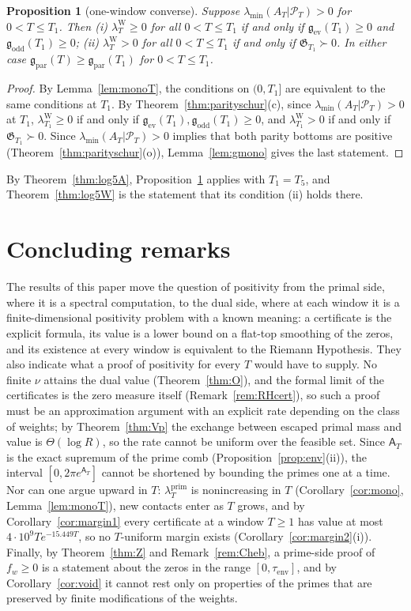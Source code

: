 \documentclass[11pt]{amsart}
\newtheorem{proposition}[theorem]{Proposition}
\theoremstyle{definition}
\theoremstyle{remark}
\newcommand{\PT}{\mathcal P_T}
\newcommand{\lamP}{\lambda^{\mathrm{prim}}_T}
\newcommand{\lamW}{\lambda^{\mathrm W}_T}
\newcommand{\lamA}{\lambda_{\min}(A_T|\PT)}
\newcommand{\Aconst}{\mathsf A_T}
\begin{document}
\begin{proposition}[one-window converse]\label{prop:onewindow}
Suppose $\lamA>0$ for $0<T\le T_1$. Then
\emph{(i)} $\lamW\ge0$ for all $0<T\le T_1$ if and only if $\mathfrak g_{\mathrm{ev}}(T_1)\ge0$ and
$\mathfrak g_{\mathrm{odd}}(T_1)\ge0$;
\emph{(ii)} $\lamW>0$ for all $0<T\le T_1$ if and only if $\mathfrak G_{T_1}\succ0$.
In either case $\mathfrak g_{\mathrm{par}}(T)\ge\mathfrak g_{\mathrm{par}}(T_1)$ for $0<T\le T_1$.
\end{proposition}
\begin{proof}
By Lemma~\ref{lem:monoT}, the conditions on $(0,T_1]$ are equivalent to the same conditions at $T_1$. By
Theorem~\ref{thm:parityschur}(c), since $\lamA>0$ at $T_1$, $\lambda^{\mathrm W}_{T_1}\ge0$ if and only if
$\mathfrak g_{\mathrm{ev}}(T_1),\mathfrak g_{\mathrm{odd}}(T_1)\ge0$, and $\lambda^{\mathrm W}_{T_1}>0$ if and only if
$\mathfrak G_{T_1}\succ0$. Since $\lamA>0$ implies that both parity bottoms are positive
(Theorem~\ref{thm:parityschur}(o)), Lemma~\ref{lem:gmono} gives the last statement.
\end{proof}

By Theorem~\ref{thm:log5A}, Proposition~\ref{prop:onewindow} applies with $T_1=T_5$, and
Theorem~\ref{thm:log5W} is the statement that its condition (ii) holds there.


\section{Concluding remarks}\label{sec:concluding}

The results of this paper move the question of positivity from the primal side, where it is a spectral
computation, to the dual side, where at each window it is a finite-dimensional positivity problem with a
known meaning: a certificate is the explicit formula, its value is a lower bound on a flat-top smoothing
of the zeros, and its existence at every window is equivalent to the Riemann Hypothesis. They also
indicate what a proof of positivity for every $T$ would have to supply. No finite $\nu$ attains the dual
value (Theorem~\ref{thm:O}), and the formal limit of the certificates is the zero measure itself
(Remark~\ref{rem:RHcert}), so such a proof must be an approximation argument with an explicit rate
depending on the class of weights; by Theorem~\ref{thm:Vp} the exchange between escaped primal mass and
value is $\Theta(\log R)$, so the rate cannot be uniform over the feasible set. Since $\Aconst$ is the exact
supremum of the prime comb (Proposition~\ref{prop:env}(ii)), the interval $[0,2\pi e^{\Aconst}]$ cannot be
shortened by bounding the primes one at a time. Nor can one argue upward in $T$: $\lamP$ is
nonincreasing in $T$ (Corollary~\ref{cor:mono}, Lemma~\ref{lem:monoT}), new contacts enter as $T$ grows, and
by Corollary~\ref{cor:margin1} every certificate at a window $T\ge1$ has value at most
$4\cdot10^9Te^{-15.449T}$, so no $T$-uniform margin exists (Corollary~\ref{cor:margin2}(i)). Finally, by
Theorem~\ref{thm:Z} and Remark~\ref{rem:Cheb}, a prime-side proof of $f_w\ge0$ is a statement about the zeros
in the range $[0,\tau_{\mathrm{env}}]$, and by Corollary~\ref{cor:void} it cannot rest only on properties of the
primes that are preserved by finite modifications of the weights.
\end{document}
